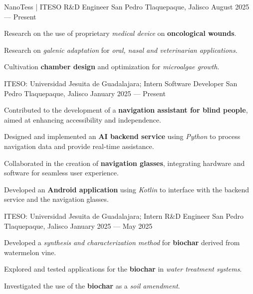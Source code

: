 \begin{cventries}

  \cventry
  {NanoTess | ITESO}
  {R\&D Engineer}
  {San Pedro Tlaquepaque, Jalisco}
  {August 2025 --- Present}
  {
    \begin{cvitems}
      \item {Research on the use of proprietary \textit{medical device} on \textbf{oncological wounds}.}
      \item {Research on \textit{galenic adaptation} for \textit{oral, nasal and veterinarian applications}.}
      \item {Cultivation \textbf{chamber design} and optimization for \textit{microalgae growth}.}
    \end{cvitems}
  }

  \cventry
  {ITESO\@: Universidad Jesuita de Guadalajara; Intern}
  {Software Developer}
  {San Pedro Tlaquepaque, Jalisco}
  {January 2025 --- Present}
  {
    \begin{cvitems}
      \item {Contributed to the development of a \textbf{navigation assistant for blind people}, aimed at enhancing accessibility and independence.}
      \item {Designed and implemented an \textbf{AI backend service} using \textit{Python} to process navigation data and provide real-time assistance.}
      \item {Collaborated in the creation of \textbf{navigation glasses}, integrating hardware and software for seamless user experience.}
      \item {Developed an \textbf{Android application} using \textit{Kotlin} to interface with the backend service and the navigation glasses.}
    \end{cvitems}
  }

  \cventry
  {ITESO\@: Universidad Jesuita de Guadalajara; Intern}
  {R\&D Engineer}
  {San Pedro Tlaquepaque, Jalisco}
  {January 2025 --- May 2025}
  {
    \begin{cvitems}
      \item {Developed a \textit{synthesis and characterization method} for \textbf{biochar} derived from watermelon vine.}
      \item {Explored and tested applications for the \textbf{biochar} in \textit{water treatment systems}.}
      \item {Investigated the use of the \textbf{biochar} as a \textit{soil amendment}.}
    \end{cvitems}
  }


\end{cventries}
